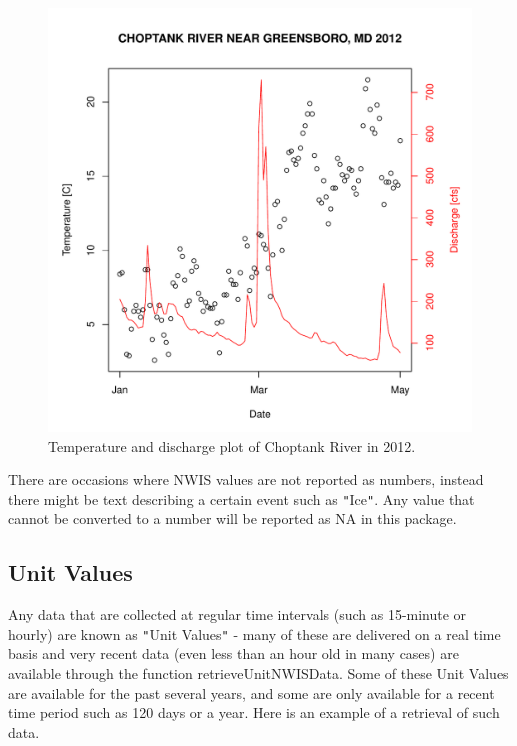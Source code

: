 \documentclass[a4paper,11pt]{article}\usepackage[]{graphicx}\usepackage[]{color}
\newenvironment{knitrout}{}{} %
\begin{document}
\begin{knitrout}
\begin{figure}[]
\includegraphics[width=1\linewidth,height=1\linewidth]{figure/getNWIStemperaturePlot} \caption[Temperature and discharge plot of Choptank River in 2012]{Temperature and discharge plot of Choptank River in 2012.\label{fig:getNWIStemperaturePlot}}
\end{figure}


\end{knitrout}



There are occasions where NWIS values are not reported as numbers, instead there might be text describing a certain event such as \texttt{"}Ice\texttt{"}.  Any value that cannot be converted to a number will be reported as NA in this package.

\FloatBarrier

\subsection{Unit Values}
\label{sec:usgsRT}
Any data that are collected at regular time intervals (such as 15-minute or hourly) are known as \texttt{"}Unit Values\texttt{"} - many of these are delivered on a real time basis and very recent data (even less than an hour old in many cases) are available through the function retrieveUnitNWISData.  Some of these Unit Values are available for the past several years, and some are only available for a recent time period such as 120 days or a year.  Here is an example of a retrieval of such data.  
\end{document}

